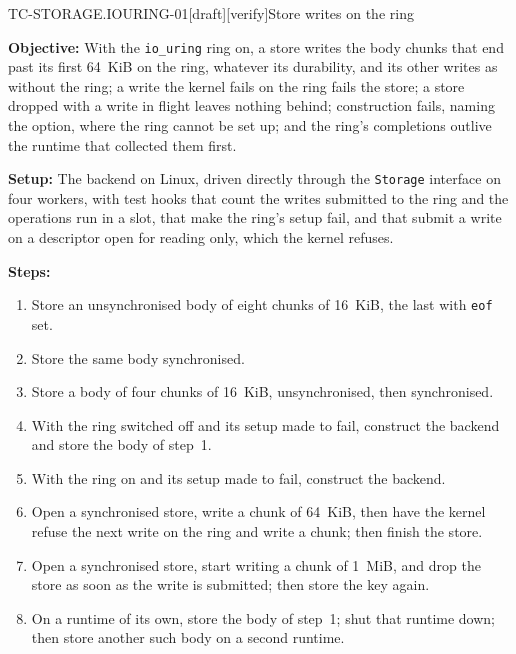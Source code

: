 \begin{requirement}{TC-STORAGE.IOURING-01}[draft][verify]{Store writes on the ring}


  \textbf{Objective:} With the \texttt{io\_uring} ring on, a store writes
  the body chunks that end past its first 64~KiB on the ring, whatever its
  durability, and its other writes as without the ring; a write the kernel
  fails on the ring fails the store; a store dropped with a write in flight
  leaves nothing behind; construction fails, naming the option, where the
  ring cannot be set up; and the ring's completions outlive the runtime that
  collected them first.

  \textbf{Setup:} The backend on Linux, driven directly through the
  \texttt{Storage} interface on four workers, with test hooks that count the
  writes submitted to the ring and the operations run in a slot, that make
  the ring's setup fail, and that submit a write on a descriptor open for
  reading only, which the kernel refuses.

  \textbf{Steps:}
  \begin{enumerate}
    \item Store an unsynchronised body of eight chunks of 16~KiB, the last
      with \texttt{eof} set.
    \item Store the same body synchronised.
    \item Store a body of four chunks of 16~KiB, unsynchronised, then
      synchronised.
    \item With the ring switched off and its setup made to fail, construct
      the backend and store the body of step~1.
    \item With the ring on and its setup made to fail, construct the
      backend.
    \item Open a synchronised store, write a chunk of 64~KiB, then have the
      kernel refuse the next write on the ring and write a chunk; then
      finish the store.
    \item Open a synchronised store, start writing a chunk of 1~MiB, and
      drop the store as soon as the write is submitted; then store the key
      again.
    \item On a runtime of its own, store the body of step~1; shut that
      runtime down; then store another such body on a second runtime.
  \end{enumerate}


\end{requirement}
